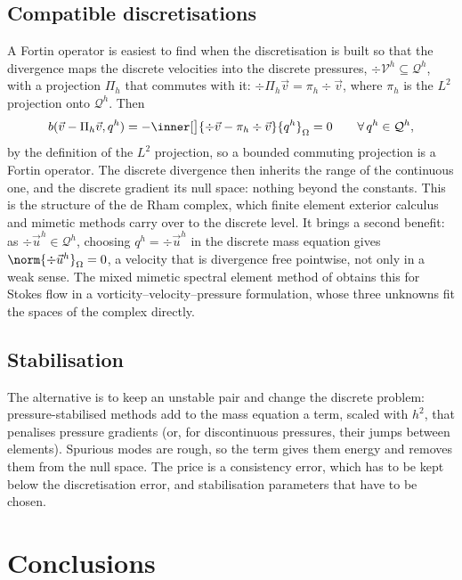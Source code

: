\subsection{Compatible discretisations}

A Fortin operator is easiest to find when the discretisation is built so that the divergence maps the discrete velocities into the discrete pressures, $\div \mathcal{V}^h \subseteq \mathcal{Q}^h$, with a projection $\Pi_h$ that commutes with it: $\div \Pi_h\vec{v} = \pi_h \div\vec{v}$, where $\pi_h$ is the $L^2$ projection onto $\mathcal{Q}^h$. Then
\begin{equation*}
    b(\vec{v} - \Pi_h\vec{v}, q^h) = -\inner[\big]{\div\vec{v} - \pi_h \div\vec{v}}{q^h}_\Omega = 0
    \qquad \forall\, q^h \in \mathcal{Q}^h ,
\end{equation*}
by the definition of the $L^2$ projection, so a bounded commuting projection is a Fortin operator. The discrete divergence then inherits the range of the continuous one, and the discrete gradient its null space: nothing beyond the constants. This is the structure of the de Rham complex, which finite element exterior calculus \parencite{Arnold2006} and mimetic methods carry over to the discrete level. It brings a second benefit: as $\div\vec{u}^h \in \mathcal{Q}^h$, choosing $q^h = \div\vec{u}^h$ in the discrete mass equation gives $\norm{\div\vec{u}^h}_\Omega = 0$, a velocity that is divergence free pointwise, not only in a weak sense. The mixed mimetic spectral element method of \textcite{Kreeft2013} obtains this for Stokes flow in a vorticity--velocity--pressure formulation, whose three unknowns fit the spaces of the complex directly.

\subsection{Stabilisation}

The alternative is to keep an unstable pair and change the discrete problem: pressure-stabilised methods add to the mass equation a term, scaled with $h^2$, that penalises pressure gradients (or, for discontinuous pressures, their jumps between elements). Spurious modes are rough, so the term gives them energy and removes them from the null space. The price is a consistency error, which has to be kept below the discretisation error, and stabilisation parameters that have to be chosen.

\section{Conclusions}\label{sec:infsup-conclusions}

